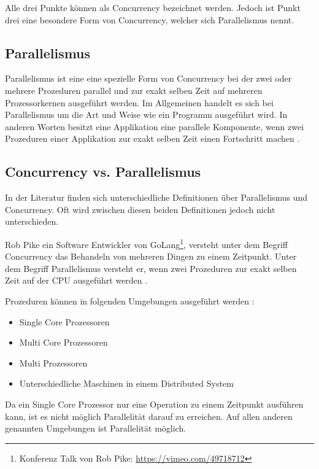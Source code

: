 Alle drei Punkte können als Concurrency bezeichnet werden. Jedoch ist Punkt drei eine besondere Form von Concurrency, welcher sich Parallelismus nennt. 

\subsection{Parallelismus}

Parallelismus ist eine eine spezielle Form von Concurrency bei der zwei oder mehrere Prozeduren parallel und  zur exakt selben Zeit auf mehreren Prozessorkernen ausgeführt werden. Im Allgemeinen handelt es sich bei Parallelismus um die Art und Weise wie ein Programm ausgeführt wird. In anderen Worten besitzt eine Applikation eine parallele Komponente, wenn zwei Prozeduren einer Applikation zur exakt selben Zeit einen Fortschritt machen \cite[]{oracle:multithreading}.

\subsection{Concurrency vs. Parallelismus}

In der Literatur finden sich unterschiedliche Definitionen über Parallelismus und Concurrency. Oft wird zwischen diesen beiden Definitionen jedoch nicht unterschieden. 

Rob Pike ein Software Entwickler von GoLang\footnote{Konferenz Talk von Rob Pike: \url{https://vimeo.com/49718712}}, versteht unter dem Begriff Concurrency das Behandeln von mehreren Dingen zu einem Zeitpunkt. Unter dem Begriff Parallelismus versteht er, wenn zwei Prozeduren zur exakt selben Zeit auf der CPU ausgeführt werden \cite[]{Pik2013}.

Prozeduren können in folgenden Umgebungen ausgeführt werden \cite[p. 14]{Erb2012}:

\begin{itemize}
  \item Single Core Prozessoren
  \item Multi Core Prozessoren
  \item Multi Prozessoren
  \item Unterschiedliche Maschinen in einem Distributed System
\end{itemize} 

Da ein Single Core Prozessor nur eine Operation zu einem Zeitpunkt ausführen kann, ist es nicht möglich Parallelität darauf zu erreichen. Auf allen anderen genannten Umgebungen ist Parallelität möglich. 

